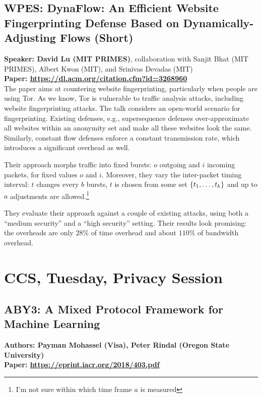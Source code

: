 \documentclass{article}
\begin{document}
\subsection{WPES: DynaFlow: An Efficient Website Fingerprinting Defense Based on Dynamically-Adjusting Flows (Short)}
\noindent\textbf{Speaker: David Lu (MIT PRIMES)}, collaboration with Sanjit Bhat (MIT PRIMES), Albert Kwon (MIT), and Srinivas Devadas (MIT)\\
\noindent\textbf{Paper: \url{https://dl.acm.org/citation.cfm?id=3268960}}\\

The paper aims at countering website fingerprinting, particularly when people are using Tor. As we know, Tor is vulnerable to traffic analysis attacks, including website fingerprinting attacks. The talk considers an open-world scenario for fingerprinting. Existing defenses, e.g., supersequence defenses over-approximate all websites within an anonymity set and make all these websites look the same. Similarly, constant flow defenses enforce a constant transmission rate, which introduces a significant overhead as well.

Their approach morphs traffic into fixed bursts: $o$ outgoing and $i$ incoming packets, for fixed values $o$ and $i$. Moreover, they vary the inter-packet timing interval: $t$ changes every $b$ bursts, $t$ is chosen from some set $\left\{ t_1, \ldots, t_k \right\}$ and up to $a$ adjustments are allowed.\footnote{I'm not sure within which time frame $a$ is measured}

They evaluate their approach against a couple of existing attacks, using both a ``medium security'' and a ``high security'' setting. Their results look promising: the overheads are only $28\%$ of time overhead and about $110\%$ of bandwidth overhead.

\section{CCS, Tuesday, Privacy Session}

\subsection{ABY3: A Mixed Protocol Framework for Machine Learning}
\noindent\textbf{Authors: Payman Mohassel (Visa), Peter Rindal (Oregon State University)}\\
\noindent\textbf{Paper: \url{https://eprint.iacr.org/2018/403.pdf}}\\
\end{document}
